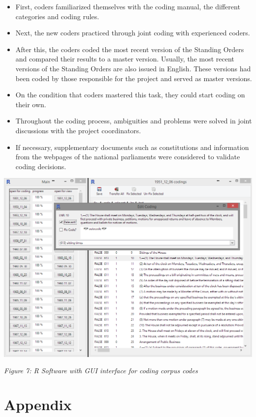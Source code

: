 \documentclass[10pt,]{article}
\providecommand{\tightlist}{%
  \setlength{\itemsep}{0pt}\setlength{\parskip}{0pt}}
\begin{document}
\begin{itemize}
\tightlist
\item
  First, coders familiarized themselves with the coding manual, the
  different categories and coding rules.
\item
  Next, the new coders practiced through joint coding with experienced
  coders.
\item
  After this, the coders coded the most recent version of the Standing
  Orders and compared their results to a master version. Usually, the
  most recent versions of the Standing Orders are also issued in
  English. These versions had been coded by those responsible for the
  project and served as master versions.
\item
  On the condition that coders mastered this task, they could start
  coding on their own.
\item
  Throughout the coding process, ambiguities and problems were solved in
  joint discussions with the project coordinators.
\item
  If necessary, supplementary documents such as constitutions and
  information from the webpages of the national parliaments were
  considered to validate coding decisions.
\end{itemize}

\begin{center}
\includegraphics[width=\textwidth]{fig/corpus.png}
\end{center}

\emph{Figure 7: R Software with GUI interface for coding corpus codes}

\newpage

\section{Appendix}\label{appendix}
\end{document}

